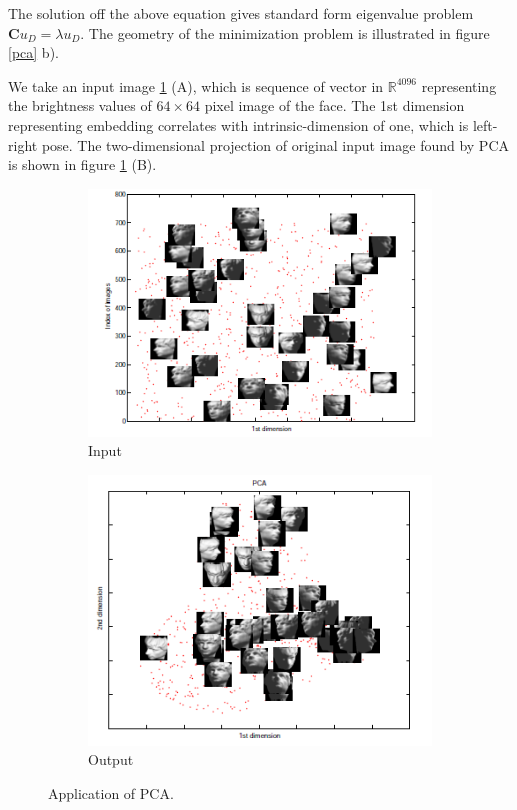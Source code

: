 The solution off the above equation gives standard form eigenvalue problem $\mathbf{C}u_D =\lambda u_D$. The geometry of the minimization problem is illustrated in figure \ref{pca} b).

We take an input image \ref{app_pca} (A), which is sequence of vector in $\mathbb{R}^{4096}$ representing the brightness values of $64\times64$ pixel image of the face. The 1st dimension representing embedding correlates with intrinsic-dimension of one, which is left-right pose. The two-dimensional projection of original input image found by PCA is shown in figure \ref{app_pca} (B).

\begin{figure}
\centering
\begin{subfigure}{.5\textwidth}
  \centering
  \includegraphics[width=\linewidth]{./Figures/original.png}
\caption{Input}
\end{subfigure}%
\begin{subfigure}{.5\textwidth}
  \centering
  \includegraphics[width=\linewidth]{./Figures/o_pca.png}
  \caption{Output}
\end{subfigure}
\caption{Application of PCA. }
\label{app_pca}
\end{figure}

